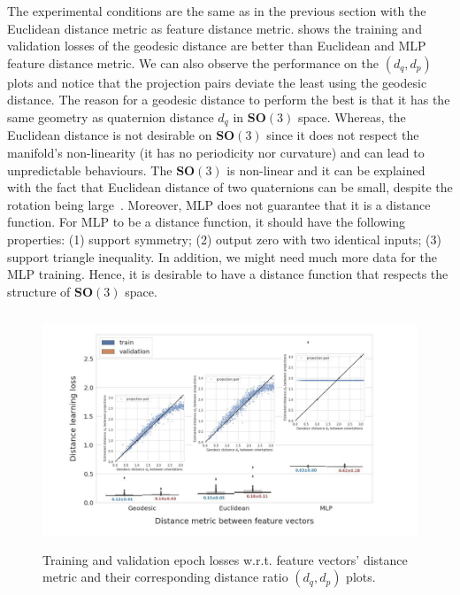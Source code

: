 The experimental conditions are the same as in the previous section with the Euclidean distance metric as feature distance metric.
 shows the training and validation losses of the geodesic distance are better than Euclidean and MLP feature distance metric. We can also observe the performance on the $(d_q, d_p)$ plots and notice that the projection pairs deviate the least using the geodesic distance.
The reason for a geodesic distance to perform the best is that it has the same geometry as quaternion distance $d_q$ in $\mathbf{SO}(3)$ space. Whereas, the Euclidean distance is not desirable on $\mathbf{SO}(3)$ since it does not respect the manifold's non-linearity (it has no periodicity nor curvature) and can lead to unpredictable behaviours. The $\mathbf{SO}(3)$ is non-linear and it can be explained with the fact that Euclidean distance of two quaternions can be small, despite the rotation being large~\cite{huynh_metrics_2009,DBLP:journals/corr/abs-1805-01026}.
Moreover, MLP does not guarantee that it is a distance function. For MLP to be a distance function, it should have the following properties: (1) support symmetry; (2) output zero with two identical inputs; (3) support triangle inequality. In addition, we might need much more data for the MLP training.
Hence, it is desirable to have a distance function that respects the structure of $\mathbf{SO}(3)$ space. 

\begin{figure}
    \centering
    \includegraphics[height=7cm]{figures/geo_eucl_mlp_distance_metric.pdf}
    \caption{
        Training and validation epoch losses w.r.t. feature vectors' distance metric and their corresponding distance ratio $(d_q, d_p)$ plots.
    }\label{fig:geo-eucl-mlp}
\end{figure}

